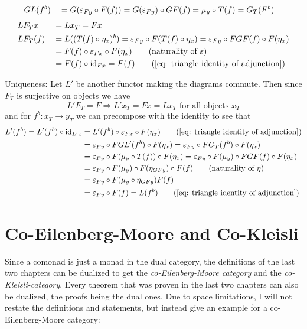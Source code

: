 \begin{beweis}
\begin{itemize1}
\begin{align*}
        &GL(f^b) &&= G(\varepsilon_{Fy} \circ F(f)) = G(\varepsilon_{Fy}) \circ GF(f) = \mu_y \circ T(f) = G_T(F^b)
    \end{align*}
    \begin{align*}
        &LF_Tx &&= Lx_T = Fx \\
        &LF_T(f) &&= L((T(f) \circ \eta_x)^b) 
        = \eps_{Fy} \circ F(T(f) \circ \eta_x) = \eps_{Fy} \circ FGF(f) \circ F(\eta_x) \\
        &&&= F(f) \circ \eps_{Fx} \circ F(\eta_x) \tag{naturality of $\eps$} \\
        &&&= F(f) \circ \id_{Fx} = F(f) \tag{\ref{eq: triangle identity of adjunction}}
    \end{align*}
    \item Uniqueness: Let $L'$ be another functor making the diagrams commute.
    Then since $F_T$ is surjective on objects we have
    \[
        L'F_T = F \Rightarrow L'x_T = Fx = Lx_T \text{ for all objects } x_T
    \]
    and for $f^b \colon x_T \to y_T$ we can precompose with the identity to see that 
    \begin{align*}
        L'(f^b) = L'(f^b) \circ \id_{L'x} &= L'(f^b) \circ \eps_{Fx} \circ F(\eta_x) \tag{\ref{eq: triangle identity of adjunction}} \\
        &= \eps_{Fy} \circ FGL'(f^b) \circ F(\eta_x) 
        = \eps_{Fy} \circ FG_T(f^b) \circ F(\eta_x) \\
        &= \eps_{Fy} \circ F(\mu_y \circ T(f)) \circ F(\eta_x) 
        = \eps_{Fy} \circ F(\mu_y) \circ FGF(f) \circ F(\eta_x) \\
        &= \eps_{Fy} \circ F(\mu_y) \circ F(\eta_{GFy}) \circ F(f) \tag{naturality of $\eta$} \\
        &= \eps_{Fy} \circ F(\mu_y \circ \eta_{GFy}) F(f) \\
        &= \eps_{Fy} \circ F(f) = L(f^b) \tag{\ref{eq: triangle identity of adjunction}}
    \end{align*}  
    \end{itemize1}
\end{beweis}
\section{Co-Eilenberg-Moore and Co-Kleisli}
Since a comonad is just a monad in the dual category, the definitions of the last two chapters can be 
dualized to get the \textit{co-Eilenberg-Moore category} and the \textit{co-Kleisli-category}.
Every theorem that was proven in the last two chapters can also be dualized, the proofs being the dual ones.
Due to space limitations, I will not restate the definitions and statements, but instead give an example for
a co-Eilenberg-Moore category:

